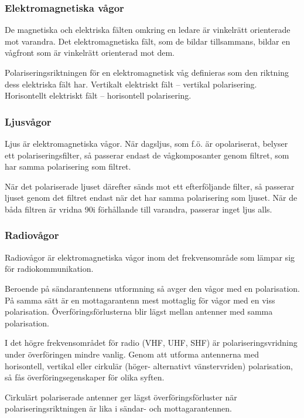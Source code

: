 \subsubsection{Elektromagnetiska vågor}

De magnetiska och elektriska fälten omkring en ledare är vinkelrätt orienterade
mot varandra. Det elektromagnetiska fält, som de bildar tillsammans, bildar en
vågfront som är vinkelrätt orienterad mot dem.

Polariseringsriktningen för en elektromagnetisk våg definieras som den riktning
dess elektriska fält har.
Vertikalt elektriskt fält -- vertikal polarisering.
Horisontellt elektriskt fält -- horisontell polarisering.

\subsubsection{Ljusvågor}

Ljus är elektromagnetiska vågor. När dagsljus, som f.ö. är opolariserat,
belyser ett polariseringsfilter, så passerar endast de vågkomposanter genom
filtret, som har samma polarisering som filtret.

När det polariserade ljuset därefter sänds mot ett efterföljande filter, så
passerar ljuset genom det filtret endast när det har samma polarisering som
ljuset. När de båda filtren är vridna 90\degree i förhållande till varandra,
passerar inget ljus alls.

\subsubsection{Radiovågor}
Radiovågor är elektromagnetiska vågor inom det frekvensområde som lämpar sig
för radiokommunikation.

Beroende på sändarantennens utformning så avger den vågor med en polarisation.
På samma sätt är en mottagarantenn mest mottaglig för vågor med en viss
polarisation. Överföringsförlusterna blir lägst mellan antenner med samma
polarisation.

I det högre frekvensområdet för radio (VHF, UHF, SHF) är polariseringsvridning
under överföringen mindre vanlig. Genom att utforma antennerna med horisontell,
vertikal eller cirkulär (höger- alternativt vänstervriden) polarisation, så fås
överföringsegenskaper för olika syften.

Cirkulärt polariserade antenner ger lägst överföringsförluster när
polariseringsriktningen är lika i sändar- och mottagarantennen.

